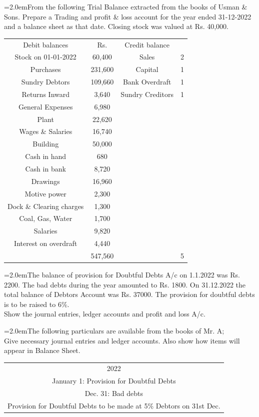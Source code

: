 \documentclass[11pt,a4paper]{article}
\newcommand{\lqn}[2]{\Needspace{6\baselineskip}\par\medskip\noindent\hangindent=2.0em\hangafter=1\makebox[2.0em][l]{\textbf{#1.}}#2\par}
\begin{document}
\lqn{92}{From the following Trial Balance extracted from the books of Usman \& Sons. Prepare a Trading and profit \& loss account for the year ended 31-12-2022 and a balance sheet as that date. Closing stock was valued at Rs. 40,000.\par
\par\smallskip\noindent\hspace*{1.2em}\begin{tabular}{|cccc|}
\hline
Debit balances & Rs. & Credit balance &  \\
Stock on 01-01-2022 & 60,400 & Sales & 2 \\
Purchases & 231,600 & Capital & 1 \\
Sundry Debtors & 109,660 & Bank Overdraft & 1 \\
Returns Inward & 3,640 & Sundry Creditors & 1 \\
General Expenses & 6,980 &  &  \\
Plant & 22,620 &  &  \\
Wages \& Salaries & 16,740 &  &  \\
Building & 50,000 &  &  \\
Cash in hand & 680 &  &  \\
Cash in bank & 8,720 &  &  \\
Drawings & 16,960 &  &  \\
Motive power & 2,300 &  &  \\
Dock \& Clearing charges & 1,300 &  &  \\
Coal, Gas, Water & 1,700 &  &  \\
Salaries & 9,820 &  &  \\
Interest on overdraft & 4,440 &  &  \\
 & 547,560 &  & 5 \\
\hline
\end{tabular}\par\smallskip
}
\lqn{93}{The balance of provision for Doubtful Debts A/c on 1.1.2022 was Rs. 2200. The bad debts during the year amounted to Rs. 1800. On 31.12.2022 the total balance of Debtors Account was Rs. 37000. The provision for doubtful debts is to be raised to 6\%.\\
Show the journal entries, ledger accounts and profit and loss A/c.\par
}
\lqn{94}{The following particulars are available from the books of Mr. A;\\
Give necessary journal entries and ledger accounts. Also show how items will appear in Balance Sheet.\par
\par\smallskip\noindent\hspace*{1.2em}\begin{tabular}{|c|}
\hline
2022 \\
January 1: Provision for Doubtful Debts \\
Dec. 31: Bad debts \\
Provision for Doubtful Debts to be made at 5\% Debtors on 31st Dec. \\
\hline
\end{tabular}\par\smallskip
}
\end{document}
